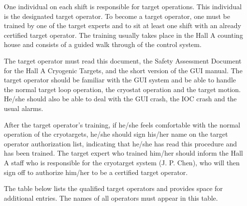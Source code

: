 One individual on each shift is responsible for target operations. 
This individual
is the designated target operator. To become a target operator, 
one must be trained by one of the target experts and to sit at least
one shift with an already certified target operator. The training usually 
takes place in the Hall A counting house and consists of a guided walk 
through of the control system. 
\par
The target operator must read this document,
the Safety Assessment Document for the Hall A Cryogenic Targets,
and the short version of the GUI manual. The target operator should
be familiar with the GUI system and be able to handle the normal target
loop operation, the cryostat operation and the target motion. 
He/she should also be able to deal with the GUI crash, the IOC crash
and the usual alarms.
\par
After the target operator's training, if he/she feels comfortable
with the normal operation of the cryotargets, he/she should sign
his/her name on the target operator authorization list, indicating that
he/she has read this procedure and has been trained. The target expert
who trained him/her should inform the Hall A staff who is responsible 
for the cryotarget system (J. P. Chen), who will then sign off to authorize
him/her to be a certified target operator. 
\par
The table below lists the qualified target operators and provides space 
for additional entries. The names of all
operators must appear in this table.

\vspace{0.3cm}

